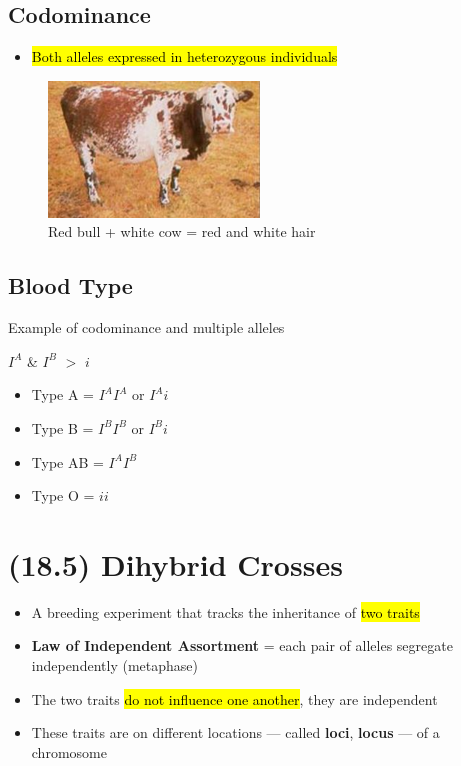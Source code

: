\documentclass[a4paper,12pt]{article}
\begin{document}
\subsection{Codominance}
\begin{itemize}
    \item{\hl{Both alleles expressed in heterozygous individuals}}
\end{itemize}

\begin{figure}[H]
    \centering
    \includegraphics[width=0.50\textwidth]{codom}
    \caption{Red bull + white cow = red and white hair}
\end{figure}

\subsection{Blood Type}
Example of codominance and multiple alleles

$I^A$ \& $I^B$ $>$ $i$
\begin{itemize}
    \item{Type A = $I^AI^A$ or $I^Ai$}
    \item{Type B = $I^BI^B$ or $I^Bi$}
    \item{Type AB = $I^AI^B$}
    \item{Type O = $ii$}
\end{itemize}

\pagebreak

\section{(18.5) Dihybrid Crosses}
\begin{itemize}
    \item{A breeding experiment that tracks the inheritance of \hl{two traits}}
    \item{\textbf{Law of Independent Assortment} = each pair of alleles segregate independently (metaphase)}
    \item{The two traits \hl{do not influence one another}, they are independent}
    \item{These traits are on different locations --- called \textbf{loci}, \textbf{locus} --- of a chromosome}
\end{itemize}
\end{document}
